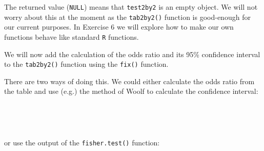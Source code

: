 \documentclass[12pt,a4paper]{book}
\newenvironment{Shaded}{\begin{snugshade}}{\end{snugshade}}
\newcommand{\CharTok}[1]{\textcolor[rgb]{0.31,0.60,0.02}{#1}}
\newcommand{\DecValTok}[1]{\textcolor[rgb]{0.00,0.00,0.81}{#1}}
\newcommand{\FloatTok}[1]{\textcolor[rgb]{0.00,0.00,0.81}{#1}}
\newcommand{\KeywordTok}[1]{\textcolor[rgb]{0.13,0.29,0.53}{\textbf{#1}}}
\newcommand{\NormalTok}[1]{#1}
\newcommand{\OperatorTok}[1]{\textcolor[rgb]{0.81,0.36,0.00}{\textbf{#1}}}
\newcommand{\StringTok}[1]{\textcolor[rgb]{0.31,0.60,0.02}{#1}}
\theoremstyle{definition}
\theoremstyle{definition}
\theoremstyle{definition}
\theoremstyle{remark}
\begin{document}
\newpage

The returned value (\texttt{NULL}) means that \texttt{test2by2} is an
empty object. We will not worry about this at the moment as the
\texttt{tab2by2()} function is good-enough for our current purposes. In
Exercise 6 we will explore how to make our own functions behave like
standard \texttt{R} functions.

We will now add the calculation of the odds ratio and its 95\%
confidence interval to the \texttt{tab2by2()} function using the
\texttt{fix()} function.

There are two ways of doing this. We could either calculate the odds
ratio from the table and use (e.g.) the method of Woolf to calculate the
confidence interval:

~

\begin{Shaded}
\end{Shaded}

~

or use the output of the \texttt{fisher.test()} function:

~

\begin{Shaded}
\end{Shaded}
\end{document}
